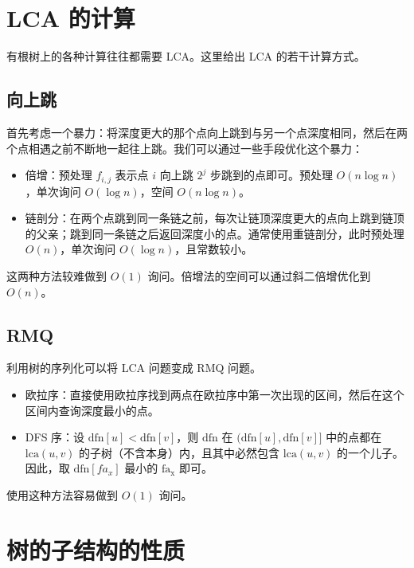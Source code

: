 \section{LCA 的计算}

有根树上的各种计算往往都需要 LCA。这里给出 LCA 的若干计算方式。

\subsection{向上跳}

首先考虑一个暴力：将深度更大的那个点向上跳到与另一个点深度相同，然后在两个点相遇之前不断地一起往上跳。我们可以通过一些手段优化这个暴力：

\begin{itemize}
    \item 倍增：预处理 $f_{i,j}$ 表示点 $i$ 向上跳 $2^j$ 步跳到的点即可。预处理 $O(n\log n)$，单次询问 $O(\log n)$，空间 $O(n\log n)$。
    \item 链剖分：在两个点跳到同一条链之前，每次让链顶深度更大的点向上跳到链顶的父亲；跳到同一条链之后返回深度小的点。通常使用重链剖分，此时预处理 $O(n)$，单次询问 $O(\log n)$，且常数较小。
\end{itemize}
\begin{remark}
    这两种方法较难做到 $O(1)$ 询问。倍增法的空间可以通过斜二倍增优化到 $O(n)$。
\end{remark}


\subsection{RMQ}

利用树的序列化可以将 LCA 问题变成 RMQ 问题。

\begin{itemize}
    \item 欧拉序：直接使用欧拉序找到两点在欧拉序中第一次出现的区间，然后在这个区间内查询深度最小的点。
    \item DFS 序：设 $\mathrm{dfn}[u]<\mathrm{dfn}[v]$，则 $\mathrm{dfn}$ 在 $(\mathrm{dfn}[u],\mathrm{dfn}[v]]$ 中的点都在 $\mathrm{lca}(u,v)$ 的子树（不含本身）内，且其中必然包含 $\mathrm{lca}(u,v)$ 的一个儿子。因此，取 $\mathrm{dfn}[fa_x]$ 最小的 $\mathrm{fa_x}$ 即可。
\end{itemize}

使用这种方法容易做到 $O(1)$ 询问。



\section{树的子结构的性质}


